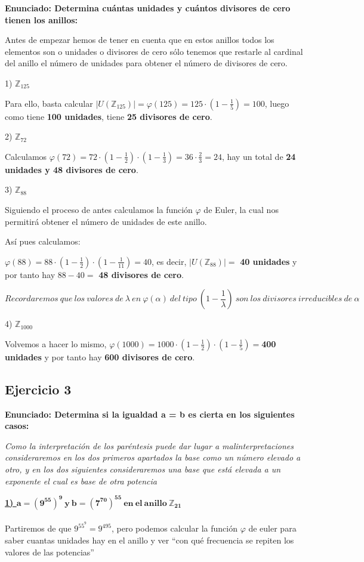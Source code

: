 \documentclass[11pt, a4paper, titlepage]{article}
\providecommand{\ent}{\mathbb{Z}}
\begin{document}
\textbf{Enunciado: Determina cuántas unidades y cuántos divisores de cero tienen los anillos:}


Antes de empezar hemos de tener en cuenta que en estos anillos todos los elementos son o unidades o divisores de cero sólo tenemos que restarle al cardinal del anillo el número de unidades para obtener el número de divisores de cero.

1) $\ent_{125}$

Para ello, basta calcular $|U(\ent_{125})| = \varphi(125) = 125 \cdot(1-\frac{1}{5}) = 100$, luego como tiene \textbf{100 unidades}, tiene \textbf{25 divisores de cero}.

2) $\ent_{72}$

Calculamos $\varphi(72) = 72\cdot(1-\frac{1}{2})\cdot(1-\frac{1}{3}) = 36\cdot \frac{2}{3} = 24$, hay un total de \textbf{24 unidades y 48 divisores de cero}.


3) $\ent_{88}$

Siguiendo el proceso de antes calculamos la función $\varphi$ de Euler, la cual nos permitirá obtener el número de unidades de este anillo.

Así pues calculamos:

$\varphi(88) = 88\cdot(1-\frac{1}{2})\cdot (1-\frac{1}{11}) = 40$, es decir, $|U(\ent_{88})| =$ \textbf{40 unidades} y por tanto hay $88-40=$ \textbf{48 divisores de cero}.

$$Recordaremos\ que\ los\ valores\ de\ \lambda\ en\ \varphi(\alpha)\ del\ tipo\ (1-\frac{1}{\lambda})\ son\ los\ divisores\ irreducibles\ de\ \alpha$$


4) $\ent_{1000}$

Volvemos a hacer lo mismo, $\varphi(1000) = 1000\cdot(1-\frac{1}{2})\cdot(1-\frac{1}{5}) = $\textbf{400 unidades} y por tanto hay \textbf{600 divisores de cero}.

\subsection{\LARGE{Ejercicio 3}}

\textbf{Enunciado: Determina si la igualdad a = b es cierta en los siguientes casos:}

\emph{Como la interpretación de los paréntesis puede dar lugar a malinterpretaciones consideraremos en los dos primeros apartados la base como un número elevado a otro, y en los dos siguientes consideraremos una base que está elevada a un exponente el cual es base de otra potencia}

\textbf{\underline{1) $\mathbf{a = (9^{55})^9\ y\ b = (7^{70})^{55}\ en\ el\ anillo\ \ent_{21} }$}}
\\\\ 
Partiremos de que $9^{55^9} = 9^{495}$, pero podemos calcular la función $\varphi$ de euler para saber cuantas unidades hay en el anillo y ver “con qué frecuencia se repiten los valores de las potencias”
\end{document}
